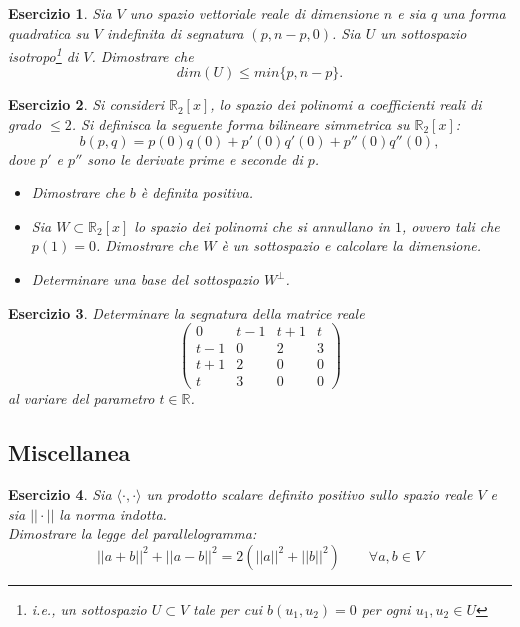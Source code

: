 \documentclass{article}
\newtheorem{es}{Esercizio}
\begin{document}
{\begin{es}
    Sia $V$ uno spazio vettoriale reale di dimensione $n$ e sia $q$ una forma quadratica su $V$ indefinita di segnatura $(p,n-p,0)$. Sia $U$ un sottospazio isotropo\footnote{i.e., un sottospazio $U\subset V$ tale per cui $b(u_1,u_2)=0$ per ogni $u_1,u_2\in U$} di $V$. Dimostrare che $$dim(U)\leq min\{p,n-p\}.$$
\end{es}

\begin{es}
    Si consideri $\mathbb{R}_2[x]$, lo spazio dei polinomi a coefficienti reali di grado $\leq 2$. Si definisca la seguente forma bilineare simmetrica su $\mathbb{R}_2[x]$: $$ b(p,q)=p(0)q(0)+p'(0)q'(0)+p''(0)q''(0),$$
    dove $p'$ e $p''$ sono le derivate prime e seconde di $p$.
    \begin{itemize}
        \item Dimostrare che $b$ è definita positiva.
        \item  Sia $W\subset \mathbb{R}_2[x]$ lo spazio dei polinomi che si annullano in $1$, ovvero tali che $p(1)=0$. Dimostrare che $W$ è un sottospazio e calcolare la dimensione.
        \item Determinare una base del sottospazio $W^\perp$.
    \end{itemize}
\end{es}



\begin{es}
    Determinare la segnatura della matrice reale
    $$\begin{pmatrix}
        0 & t-1 & t+1 & t\\
        t-1 & 0 & 2 & 3\\
        t+1 & 2 & 0 & 0\\
        t & 3 & 0 & 0
    \end{pmatrix}$$
    al variare del parametro $t\in \mathbb{R}$.
\end{es}





\subsection{Miscellanea}




\begin{es}
    Sia $\langle \cdot, \cdot \rangle$ un prodotto scalare definito positivo sullo spazio reale  $V$ e sia $||\cdot||$ la norma indotta.\\
    Dimostrare la legge del parallelogramma:
    $$||a+b||^2+||a-b||^2=2(||a||^2+||b||^2)\qquad \forall a,b\in V$$
\end{es}



}
\end{document}
